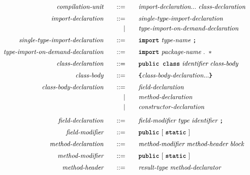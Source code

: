 \begin{alignat*}{9}
&& \textit{compilation-unit}                     && \quad ::= & \quad && \textit{import-declaration} ... \ \textit{class-declaration}  && \\[1mm]
&& \textit{import-declaration} && \quad ::= & \quad && \textit{single-type-import-declaration} && \\
&& && | & \quad && \textit{type-import-on-demand-declaration} && \\[1mm]
&& \textit{single-type-import-declaration} && \quad ::= & \quad && \textbf{\texttt{import}} \ \textit{type-name} \ \textbf{\texttt{;}} && \\[1mm]
&& \textit{type-import-on-demand-declaration} && \quad ::= & \quad && \textbf{\texttt{import}} \ \textit{package-name} \ \textbf{\texttt{$.\ *$}} && \\[1mm]
&& \textit{class-declaration}                    && \quad ::= & \quad && \textbf{\texttt{public class}} \ \textit{identifier} \ \textit{class-body} && \\[1mm]
&& \textit{class-body}                           && \quad ::= & \quad && \textbf{\texttt{\{}} \textit{class-body-declaration} ... \textbf{\texttt{\}}} && \\[1mm]
&& \textit{class-body-declaration}               && \quad ::= & \quad && \textit{field-declaration} && \\
&&                                               &&         | & \quad && \textit{method-declaration} && \\
&&                                               &&         | & \quad && \textit{constructor-declaration} && \\[2mm]
&& \textit{field-declaration}                    && \quad ::= & \quad && \textit{field-modifier} \ \textit{type} \ \textit{identifier} \ \textbf{\texttt{;}} && \\[1mm]
&& \textit{field-modifier}                       && \quad ::= & \quad && \textbf{\texttt{public}} \ [ \ \textbf{\texttt{static}} \ ] && \\[1mm]
&& \textit{method-declaration}                   && \quad ::= & \quad && \textit{method-modifier} \ \textit{method-header} \ \textit{block} && \\[1mm]
&& \textit{method-modifier}                      && \quad ::= & \quad && \textbf{\texttt{public}} \ [ \ \textbf{\texttt{static}} \ ] && \\[1mm]
&& \textit{method-header}                        && \quad ::= & \quad && \textit{result-type} \ \textit{method-declarator} && \\[1mm]

\end{alignat*}
